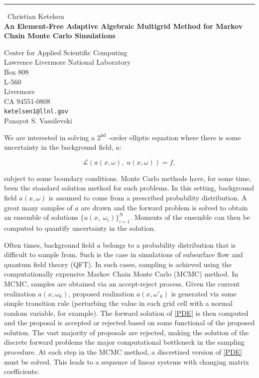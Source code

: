 \documentclass{report}
\begin{document}
\begin{center}
\rule{6in}{1pt} \
{\large Christian Ketelsen \\
{\bf An Element-Free Adaptive Algebraic Multigrid Method for Markov Chain Monte Carlo Simulations}}

Center for Applied Scientific Computing \\ Lawrence Livermore National Laboratory \\ Box 808 \\ L-560 \\ Livermore \\ CA 94551-0808
\\
{\tt ketelsen1@llnl.gov}\\
Panayot S.  Vassilevski\end{center}

We are interested in solving a $2^{\text{nd}}$ -order elliptic equation
where there is some uncertainty in the
background field, $a$:

\begin{equation}\label{PDE}
\mathcal{L}(a(x,\omega),\;u(x,\omega)) =f,
\end{equation}

subject to some boundary conditions. Monte Carlo methods have, for some
time, been the standard solution
method for such problems. In this setting, background field $a(x,\omega)$
is assumed to come from a prescribed
probability distribution. A great many samples of $a$ are drawn and the
forward problem is solved to obtain an
ensemble of solutions $\{u(x,\;\omega_i)\}^N_{i=1}$. Moments of the
ensemble can then be computed to quantify uncertainty in the solution.

Often times, background field $a$ belongs to a probability distribution
that is difficult to sample from.
Such is the case in simulations of subsurface flow and quantum field
theory (QFT). In such cases, sampling
is achieved using the computationally expensive Markov Chain Monte Carlo
(MCMC) method. In MCMC,
samples are obtained via an accept-reject process. Given the current
realization $a(x, \omega_k)$, proposed realization $a(x, \omega{'}_k)$ is
generated via some simple transition rule (perturbing the value in each
grid cell with a normal random variable, for example).
The forward solution of \eqref{PDE} is then computed and the proposal is
accepted or rejected based on some functional of the proposed solution.
The vast majority of proposals are rejected,
making the solution of the discrete forward problems the major
computational bottleneck in the sampling
procedure. At each step in the MCMC method, a discretized version of
\eqref{PDE} must be solved. This leads to a sequence
of linear systems with changing matrix coefficients:
\end{document}
